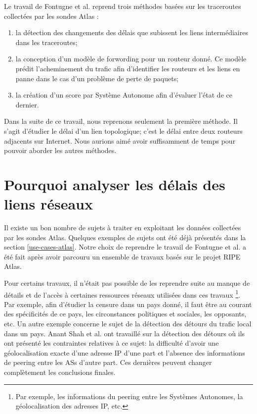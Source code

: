 Le travail de  Fontugne et al. \cite{DBLP:journals/corr/FontugneAPB16} reprend trois méthodes basées sur les traceroutes collectées par les sondes Atlas :

\begin{enumerate}
	\item la détection des changements des délais que subissent les liens intermédiaires dans les traceroutes; 
	
	\item la conception d'un modèle de forwording pour un routeur donné. Ce modèle  prédit l'acheminement du trafic afin d'identifier les routeurs  et les liens en panne dans le cas  d'un problème  de perte de paquets;
	
	\item la création d'un score par Système Autonome afin d'évaluer l'état de ce dernier.
	
\end{enumerate}

Dans la suite de ce travail, nous  reprenons seulement la première méthode.  Il s'agit d'étudier le délai d'un lien topologique; c'est le délai entre deux routeurs adjacents sur Internet. Nous aurions aimé avoir suffisamment de temps pour pouvoir aborder les autres méthodes.  



\section{Pourquoi analyser les délais des liens réseaux}

Il existe un bon nombre de sujets à traiter en exploitant les données collectées par les sondes Atlas. Quelques exemples de sujets ont été déjà présentés dans la section \ref{use-cases-atlas}. Notre choix de reprendre le travail de Fontugne et al. a été fait après avoir parcouru un ensemble de travaux basés sur le projet  RIPE Atlas. 

Pour certains travaux, il n'était pas possible  de les reprendre suite au manque de détails et de l'accès à  certaines ressources réseaux utilisées dans ces travaux \footnote{Par exemple, les informations du peering entre les Systèmes Autonomes, la géolocalisation des adresses IP, etc.}. Par exemple, afin d'étudier la censure dans un pays donné, il faut être au courant des spécificités de ce pays, les circonstances politiques et sociales, les opposants,  etc.  Un autre exemple concerne le sujet de la détection des détours du trafic local dans un pays.  Anant Shah  et al. ont travaillé sur la détection des détours \cite{anant-shah} où ils ont présenté  les contraintes relatives à ce sujet: la difficulté d'avoir une géolocalisation exacte d'une adresse IP d'une part et l'absence des informations de peering entre les ASs d'autre part. Ces dernières peuvent changer complètement les conclusions finales. 

